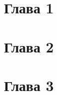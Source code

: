 \newpage
{}
\newpage
\section{Глава 1}
\newpage
\section{Глава 2}
\newpage
\section{Глава 3}
\newpage
{}